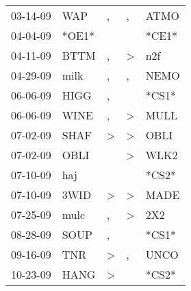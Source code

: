 \begin{supertabular}{p{0.07\textwidth}p{0.06\textwidth}p{0.02\textwidth}p{0.02\textwidth}p{0.06\textwidth}}
          03-14-09\textsuperscript{} &            WAP\textsuperscript{} &                , &                , &           ATMO\textsuperscript{} \\
          04-04-09\textsuperscript{} &                            *OE1* &                  &                  &                            *CE1* \\
          04-11-09\textsuperscript{} &           BTTM\textsuperscript{} &                , &     \textgreater &            n2f\textsuperscript{} \\
          04-29-09\textsuperscript{} &           milk\textsuperscript{} &                , &                , &           NEMO\textsuperscript{} \\
          06-06-09\textsuperscript{} &           HIGG\textsuperscript{} &                , &                  &                            *CS1* \\
          06-06-09\textsuperscript{} &           WINE\textsuperscript{} &                , &     \textgreater &           MULL\textsuperscript{} \\
          07-02-09\textsuperscript{} &           SHAF\textsuperscript{} &     \textgreater &     \textgreater &           OBLI\textsuperscript{} \\
          07-02-09\textsuperscript{} &           OBLI\textsuperscript{} &                  &     \textgreater &           WLK2\textsuperscript{} \\
          07-10-09\textsuperscript{} &            haj\textsuperscript{} &                  &                  &                            *CS2* \\
          07-10-09\textsuperscript{} &           3WID\textsuperscript{} &     \textgreater &     \textgreater &           MADE\textsuperscript{} \\
          07-25-09\textsuperscript{} &           mulc\textsuperscript{} &                , &     \textgreater &            2X2\textsuperscript{} \\
          08-28-09\textsuperscript{} &           SOUP\textsuperscript{} &                , &                  &                            *CS1* \\
          09-16-09\textsuperscript{} &            TNR\textsuperscript{} &     \textgreater &                , &           UNCO\textsuperscript{} \\
          10-23-09\textsuperscript{} &           HANG\textsuperscript{} &     \textgreater &                  &                            *CS2* \\

\end{supertabular}

